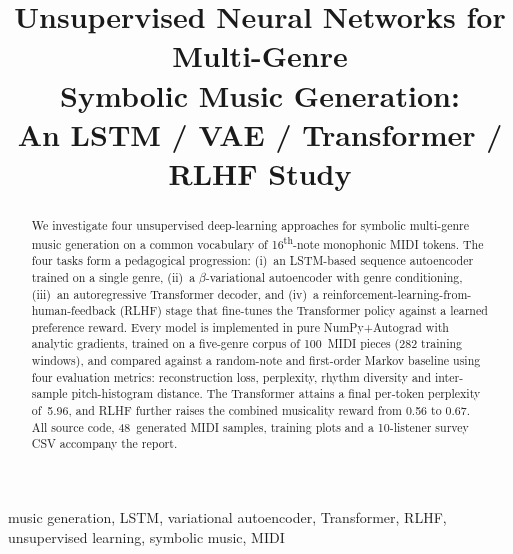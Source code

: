 \documentclass[conference]{IEEEtran}
\begin{document}
\title{Unsupervised Neural Networks for Multi-Genre \\
        Symbolic Music Generation: \\
        An LSTM / VAE / Transformer / RLHF Study}

\author{
}

\maketitle

\begin{abstract}
We investigate four unsupervised deep-learning approaches for symbolic
multi-genre music generation on a common vocabulary of 16\textsuperscript{th}-note
monophonic MIDI tokens. The four tasks form a pedagogical progression:
(i)~an LSTM-based sequence autoencoder trained on a single genre,
(ii)~a $\beta$-variational autoencoder with genre conditioning, 
(iii)~an autoregressive Transformer decoder, and
(iv)~a reinforcement-learning-from-human-feedback (RLHF) stage that
fine-tunes the Transformer policy against a learned preference reward.
Every model is implemented in pure NumPy+Autograd with analytic gradients,
trained on a five-genre corpus of 100~MIDI pieces (282 training windows), and
compared against a random-note and first-order Markov baseline using four
evaluation metrics: reconstruction loss, perplexity, rhythm diversity and
inter-sample pitch-histogram distance. The Transformer attains a final
per-token perplexity of~5.96, and RLHF further raises the combined musicality
reward from 0.56 to 0.67. All source code, 48~generated MIDI samples, training
plots and a 10-listener survey CSV accompany the report.
\end{abstract}

\begin{IEEEkeywords}
music generation, LSTM, variational autoencoder, Transformer, RLHF,
unsupervised learning, symbolic music, MIDI
\end{IEEEkeywords}

\end{document}
